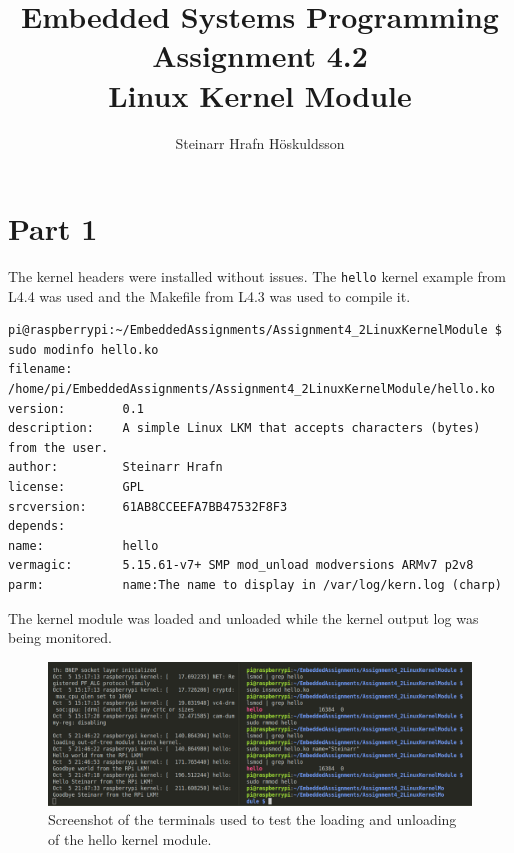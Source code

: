 \documentclass{article}
\title{Embedded Systems Programming \\ Assignment 4.2 \\ \large Linux Kernel Module}
\author{Steinarr Hrafn Höskuldsson}
\newcommand{\mycomment}[1]{}
\begin{document}
\pagestyle{firststyle}
{\let\newpage\relax\maketitle}

\mycomment{
\begin{figure}[h]
    \centering
    \texttt{[image: LAB3/Basic1.png]}
    \caption{"Switch test" Breadboard set up}
    \label{fig:Switch_test}
\end{figure}



}

\section*{Part 1}
The kernel headers were installed without issues. The \verb!hello! kernel example from L4.4 was used and the Makefile from L4.3 was used to compile it.

\begin{lstlisting}[caption={The output of modinfo}]
pi@raspberrypi:~/EmbeddedAssignments/Assignment4_2LinuxKernelModule $ sudo modinfo hello.ko
filename:       /home/pi/EmbeddedAssignments/Assignment4_2LinuxKernelModule/hello.ko
version:        0.1
description:    A simple Linux LKM that accepts characters (bytes) from the user.
author:         Steinarr Hrafn
license:        GPL
srcversion:     61AB8CCEEFA7BB47532F8F3
depends:        
name:           hello
vermagic:       5.15.61-v7+ SMP mod_unload modversions ARMv7 p2v8 
parm:           name:The name to display in /var/log/kern.log (charp)
\end{lstlisting}

The kernel module was loaded and unloaded while the kernel output log was being monitored. 
\begin{figure}[h]
    \centering
    \includegraphics[width=\textwidth]{Assignment4_2LinuxKernelModule/part1_kernel_loading.png}
    \caption{Screenshot of the terminals used to test the loading and unloading of the hello kernel module.}
    \label{fig:kernel_loading}
\end{figure}
\end{document}
